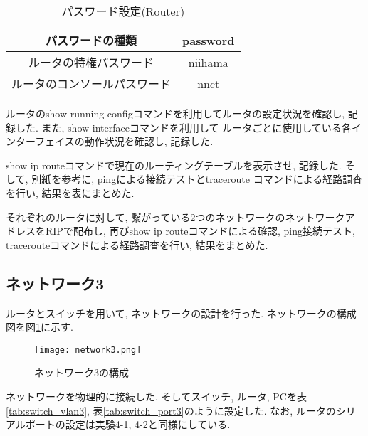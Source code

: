 \documentclass{jsarticle}
\begin{document}
\begin{table}[htb]
  \begin{center}
    \caption{パスワード設定(Router)}
    \begin{tabular}{cc} \hline
     パスワードの種類 & password \\ \hline
      ルータの特権パスワード & niihama   \\ 
      ルータのコンソールパスワード & nnct \\ \hline
    \end{tabular}
	\label{tab:password2}
  \end{center}
\end{table}

ルータのshow running-configコマンドを利用してルータの設定状況を確認し, 記録した. また,  show interfaceコマンドを利用して
ルータごとに使用している各インターフェイスの動作状況を確認し, 記録した. 

show ip routeコマンドで現在のルーティングテーブルを表示させ, 記録した. そして, 別紙を参考に, pingによる接続テストとtraceroute
コマンドによる経路調査を行い, 結果を表にまとめた. 

それぞれのルータに対して, 繋がっている2つのネットワークのネットワークアドレスをRIPで配布し, 再びshow ip routeコマンドによる確認, 
ping接続テスト, tracerouteコマンドによる経路調査を行い, 結果をまとめた. 


\subsection{ネットワーク3} 
ルータとスイッチを用いて, ネットワークの設計を行った. ネットワークの構成図を図\ref{fig:network3}に示す. 

\begin{figure}[htb]%
\begin{center}
\setlength{\unitlength}{1mm}
\texttt{[image: network3.png]}
\end{center}

\caption{ネットワーク3の構成}
\label{fig:network3}
\end{figure}

ネットワークを物理的に接続した. そしてスイッチ, ルータ, PCを表\ref{tab:switch_vlan3}, 表\ref{tab:switch_port3}のように設定した. 
なお, ルータのシリアルポートの設定は実験4-1, 4-2と同様にしている. 
\end{document}
